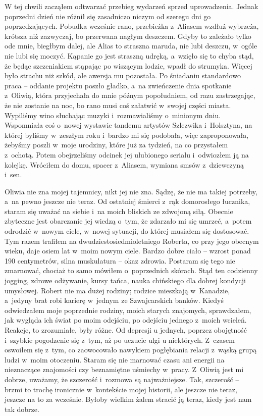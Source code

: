 W tej chwili zacząłem odtwarzać przebieg wydarzeń sprzed uprowadzenia. Jednak poprzedni dzień nie różnił się zasadniczo niczym od szeregu dni go poprzedzających. Pobudka wcześnie rano, przebieżka z~Aliasem wzdłuż wybrzeża, krótsza niż zazwyczaj, bo przerwana nagłym deszczem. Gdyby to zależało tylko ode mnie, biegłbym dalej, ale Alias to straszna maruda, nie lubi deszczu, w~ogóle nie lubi się moczyć. Kąpanie go jest straszną udręką, a~wzięło się to chyba stąd, że będąc szczeniakiem stąpając po wiszącym lodzie, wpadł do strumyka. Więcej było strachu niż szkód, ale awersja mu pozostała. Po śniadaniu standardowo praca -- oddanie projektu poszło gładko, a~na zwieńczenie dnia spotkanie z~Oliwią, która przyjechała do mnie późnym popołudniem, od razu zastrzegając, że nie zostanie na noc, bo rano musi coś załatwić w~swojej części miasta. Wypiliśmy wino słuchając muzyki i~rozmawialiśmy o~minionym dniu. Wspomniała coś o~nowej wystawie tandemu artystów Szlezwika i~Holsztyna, na której byliśmy w~zeszłym roku i~bardzo mi się podobała, więc zaproponowała, żebyśmy poszli w~moje urodziny, które już za tydzień, na co przystałem z~ochotą. Potem obejrzeliśmy odcinek jej ulubionego serialu i~odwiozłem ją na kolejkę. Wróciłem do domu, spacer z~Aliasem, wymiana smsów z~dziewczyną i~sen.

Oliwia nie zna mojej tajemnicy, nikt jej nie zna. Sądzę, że nie ma takiej potrzeby, a~na pewno jeszcze nie teraz. Od ostatniej śmierci z~rąk domorosłego łucznika, staram się uważać na siebie i~na moich bliskich ze zdwojoną siłą. Obecnie zbyteczne jest obarczanie jej wiedzą o~tym, że zdarzało mi się umrzeć, a~potem odrodzić w~nowym ciele, w~nowej sytuacji, do której musiałem się dostosować. Tym razem trafiłem na dwudziestosiedmioletniego Roberta, co przy jego obecnym wieku, daje osiem lat w~moim nowym ciele. Bardzo dobre ciało -- wzrost ponad 190 centymetrów, silna muskulatura -- okaz zdrowia. Postaram się tego nie zmarnować, chociaż to samo mówiłem o~poprzednich skórach. Stąd ten codzienny jogging, zdrowe odżywanie, kursy tańca, nauka chińskiego dla dobrej kondycji umysłowej. Robert nie ma dużej rodziny; rodzice mieszkają w~Kanadzie, a~jedyny brat robi karierę w~jednym ze Szwajcarskich banków. Kiedyś odwiedzałem moje poprzednie rodziny, moich starych znajomych, sprawdzałem, jak wygląda ich świat po moim odejściu, po odejściu jednego z~moich wcieleń. Reakcje, to zrozumiałe, były różne. Od depresji u jednych, poprzez obojętność i~szybkie pogodzenie się z~tym, aż po uczucie ulgi u niektórych. Z~czasem oswoiłem się z~tym, co zaowocowało nawykiem pogłębiania relacji z~wąską grupą ludzi w~moim otoczeniu. Staram się nie marnować czasu ani energii na nieznaczące znajomości czy beznamiętne uśmiechy w~pracy. Z~Oliwią jest mi dobrze, uważamy, że szczerość i~rozmowa są najważniejsze. Tak, szczerość -- brzmi to trochę ironicznie w~kontekście mojej historii, ale jeszcze nie teraz, jeszcze na to za wcześnie. Byłoby wielkim żalem stracić ją teraz, kiedy jest nam tak dobrze.

